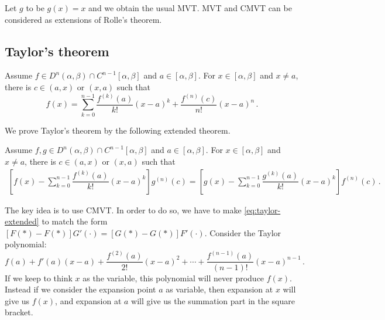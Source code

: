 \documentclass{article}
\begin{document}
Let $ g $ to be $ g(x) = x $ and we obtain the usual MVT. MVT and CMVT can be considered as extensions of Rolle's theorem.

\subsection{Taylor's theorem}
\begin{theorem} \label{thm:taylor}
    Assume $ f \in D^{n} (\alpha, \beta) \cap C^{n - 1} [\alpha, \beta] $ and $ a \in [\alpha, \beta] $. For $ x \in [\alpha, \beta] $ and $ x \neq a $, there is $ c \in (a, x) \text { or } (x, a) $ such that
    \[
        f(x) = \sum_{k = 0}^{n-1} \dfrac{f^{(k)} (a)}{k!} (x - a)^k + \dfrac{f^{(n)}(c)}{n!} (x - a)^n \,.
    \]
\end{theorem}

We prove Taylor's theorem by the following extended theorem.

\begin{theorem}
    Assume $ f, g \in D^{n} (\alpha, \beta) \cap C^{n - 1} [\alpha, \beta] $ and $ a \in [\alpha, \beta] $. For $ x \in [\alpha, \beta] $ and $ x \neq a $, there is $ c \in (a, x) \text { or } (x, a) $ such that
    \begin{align} \label{eq:taylor-extended}
        \left[ f(x) - \sum_{k=0}^{n-1} \dfrac{f^{(k)} (a)}{k!} (x - a)^k \right] g^{(n)}(c) = \left[ g(x) - \sum_{k=0}^{n-1} \dfrac{g^{(k)} (a)}{k!} (x - a)^k \right] f^{(n)}(c) \,. 
    \end{align}
\end{theorem}
The key idea is to use CMVT. In order to do so, we have to make \eqref{eq:taylor-extended} to match the form $ [F(*) - F(*)] G'(\cdot) = [G(*) - G(*)] F'(\cdot) $. Consider the Taylor polynomial:
\[
    f(a) + f'(a) (x - a) + \dfrac{f^{(2)}(a)}{2!} (x - a)^2 + \cdots + \dfrac{f^{(n-1)}(a)}{(n-1)!} (x - a)^{n-1} \,.
\]
If we keep to think $ x $ as the variable, this polynomial will never produce $ f(x) $. Instead if we consider the expansion point $ a $ as variable, then expansion at $ x $ will give us $ f(x) $, and expansion at $ a $ will give us the summation part in the square bracket.
\end{document}
